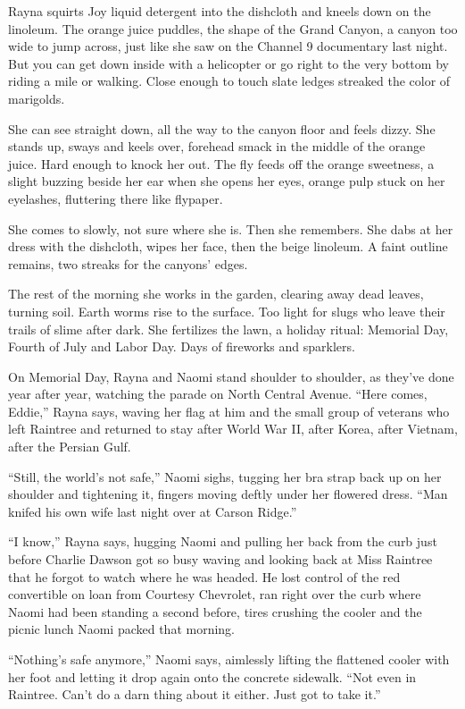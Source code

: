 \documentclass[twoside,10pt]{book}
\begin{document}
Rayna squirts Joy liquid detergent into the dishcloth and kneels down on
the linoleum. The orange juice puddles, the shape of the Grand Canyon, a
canyon too wide to jump across, just like she saw on the Channel 9
documentary last night. But you can get down inside with a helicopter or
go right to the very bottom by riding a mile or walking. Close enough to
touch slate ledges streaked the color of marigolds.

She can see straight down, all the way to the canyon floor and feels
dizzy. She stands up, sways and keels over, forehead smack in the middle
of the orange juice. Hard enough to knock her out. The fly feeds off the
orange sweetness, a slight buzzing beside her ear when she opens her
eyes, orange pulp stuck on her eyelashes, fluttering there like
flypaper.

She comes to slowly, not sure where she is. Then she remembers. She dabs
at her dress with the dishcloth, wipes her face, then the beige
linoleum. A faint outline remains, two streaks for the canyons' edges.

The rest of the morning she works in the garden, clearing away dead
leaves, turning soil. Earth worms rise to the surface. Too light for
slugs who leave their trails of slime after dark. She fertilizes the
lawn, a holiday ritual: Memorial Day, Fourth of July and Labor Day. Days
of fireworks and sparklers.

On Memorial Day, Rayna and Naomi stand shoulder to shoulder, as they've
done year after year, watching the parade on North Central Avenue.
``Here comes, Eddie,'' Rayna says, waving her flag at him and the small
group of veterans who left Raintree and returned to stay after World War
II, after Korea, after Vietnam, after the Persian Gulf.

``Still, the world's not safe,'' Naomi sighs, tugging her bra strap back
up on her shoulder and tightening it, fingers moving deftly under her
flowered dress. ``Man knifed his own wife last night over at Carson
Ridge.''

``I know,'' Rayna says, hugging Naomi and pulling her back from the curb
just before Charlie Dawson got so busy waving and looking back at Miss
Raintree that he forgot to watch where he was headed. He lost control of
the red convertible on loan from Courtesy Chevrolet, ran right over the
curb where Naomi had been standing a second before, tires crushing the
cooler and the picnic lunch Naomi packed that morning.

``Nothing's safe anymore,'' Naomi says, aimlessly lifting the flattened
cooler with her foot and letting it drop again onto the concrete
sidewalk. ``Not even in Raintree. Can't do a darn thing about it either.
Just got to take it.''
\end{document}
